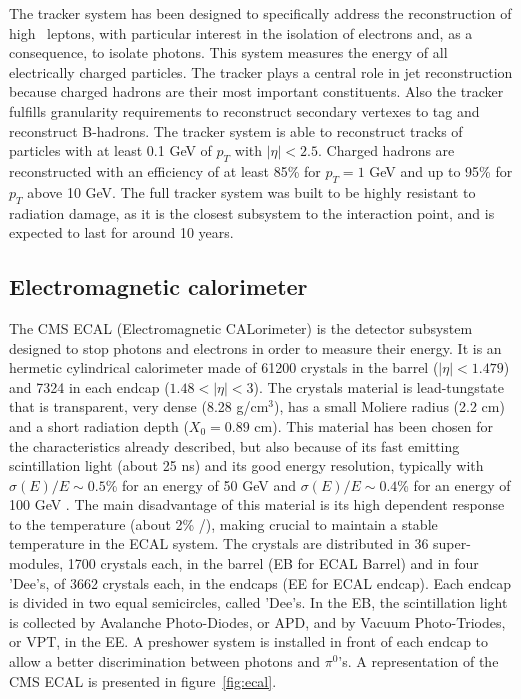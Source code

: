The tracker system has been designed to specifically address the reconstruction of high \pt~leptons, with particular interest in the isolation of electrons and, as a consequence, to isolate photons. This system measures the energy of all electrically charged particles. The tracker plays a central role in jet reconstruction because charged hadrons are their most important constituents. Also the tracker fulfills granularity requirements to reconstruct secondary vertexes to tag and reconstruct B-hadrons. The tracker system is able to reconstruct tracks of particles with at least 0.1 GeV of $p_{T}$ with $|\eta|<2.5$. Charged hadrons are reconstructed with an efficiency of at least 85\% for $p_{T}=1$ GeV and up to 95\% for $p_{T}$ above 10 GeV. The full tracker system was built to be highly resistant to radiation damage, as it is the closest subsystem to the interaction point, and is expected to last for around 10 years. %

\subsection{Electromagnetic calorimeter}
\label{sec:ecal}

The CMS ECAL (Electromagnetic CALorimeter) is the detector subsystem designed to stop photons and electrons in order to measure their energy. It is an hermetic cylindrical calorimeter made of 61200 crystals in the barrel ($|\eta|<1.479$) and 7324 in each endcap ($1.48<|\eta|<3$). The crystals material is lead-tungstate that is transparent, very dense (8.28 g/$\text{cm}^{3}$), has a small Moliere radius (2.2 cm) and a short radiation depth ($X_{0}=0.89$ cm). This material has been chosen for the characteristics already described, but also because of its fast emitting scintillation light (about 25 ns) and its good energy resolution, typically with $\sigma(E)/E\sim 0.5$\% for an energy of 50 GeV and $\sigma(E)/E\sim 0.4$\% for an energy of 100 GeV . The main disadvantage of this material is its high dependent response to the temperature (about 2\% /\celsius), making crucial to maintain a stable temperature in the ECAL system. The crystals are distributed in 36 super-modules, 1700 crystals each, in the barrel (EB for ECAL Barrel) and in four 'Dee's, of 3662 crystals each, in the endcaps (EE for ECAL endcap). Each endcap is divided in two equal semicircles, called 'Dee's. In the EB, the scintillation light is collected by Avalanche Photo-Diodes, or APD, and by Vacuum Photo-Triodes, or VPT, in the EE. A preshower system is installed in front of each endcap to allow a better discrimination between photons and $\pi^{0}$'s. A representation of the CMS ECAL is presented in figure~\ref{fig:ecal}.

